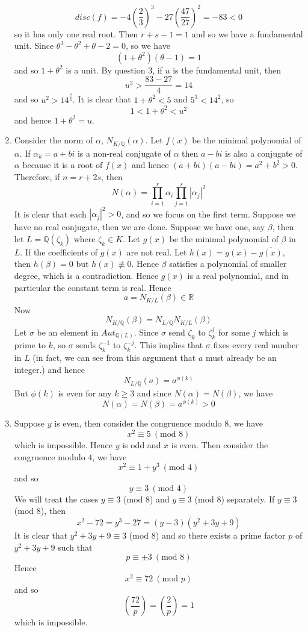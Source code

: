 \begin{enumerate}
$$disc(f)=-4(\frac{2}{3})^3-27(\frac{47}{27})^2=-83<0$$
so it has only one real root. Then $r+s-1=1$ and so we have a fundamental unit. Since $\theta^3-\theta^2+\theta-2=0$, so we have
$$(1+\theta^2)(\theta-1)=1$$
and so $1+\theta^2$ is a unit.
By question $3$, if $u$ is the fundamental unit, then
$$u^3>\frac{83-27}{4}=14$$
and so $u^2>14^{\frac{2}{3}}$.
It is clear that $1+\theta^2<5$ and $5^3<14^2$, so
$$1<1+\theta^2<u^2$$
and hence $1+\theta^2=u$.
\item Consider the norm of $\alpha$, $N_{K/\mathbb{Q}}(\alpha)$. Let $f(x)$ be the minimal polynomial of $\alpha$.
If $\alpha_k=a+bi$ is a non-real conjugate of $\alpha$ then $a-bi$ is also a conjugate of $\alpha$ because it is a root of $f(x)$ and hence
$(a+bi)(a-bi)=a^2+b^2>0$. Therefore, if $n=r+2s$, then
$$N(\alpha)=\prod_{i=1}^r \alpha_i \prod_{j=1}^s |\alpha_j|^2$$
It is clear that each $|\alpha_j|^2>0$, and so we focus on the first term. Suppose we have no real conjugate, then
we are done. Suppose we have one, say $\beta$, then let $L=\mathbb{Q}(\zeta_k)$ where $\zeta_k \in K$.
Let $g(x)$ be the minimal polynomial of $\beta$ in $L$.
If the coefficients of $g(x)$ are not real.
Let $h(x)=g(x)-\overline{g(x)}$, then $h(\beta)=0$ but $h(x) \not \equiv 0$. Hence $\beta$ satisfies a
polynomial of smaller degree, which is a contradiction. Hence $g(x)$ is a real polynomial, and in particular
the constant term is real. Hence
$$a=N_{K/L}(\beta) \in \mathbb{R}$$
Now
$$N_{K/\mathbb{Q}}(\beta)=N_{L/\mathbb{Q}} N_{K/L}(\beta)$$
Let $\sigma$ be an element in $Aut_{\mathbb{Q}(L)}$. Since $\sigma$ send $\zeta_k$ to $\zeta^j_k$ for some $j$
which is prime to $k$, so $\sigma$ sends $\zeta^{-1}_k$ to $\zeta^{-j}_k$. This implies that
$\sigma$ fixes every real number in $L$ (in fact, we can see from this argument that $a$ must already be an integer.) and hence
$$N_{L/\mathbb{Q}}(a)=a^{\phi(k)}$$
But $\phi(k)$ is even for any $k \ge 3$ and since $N(\alpha)=N(\beta)$, we have
$$N(\alpha)=N(\beta)=a^{\phi(k)}>0$$
\item Suppose $y$ is even, then consider the congruence modulo $8$, we have
$$x^2 \equiv 5~(\text{mod } 8)$$
which is impossible. Hence $y$ is odd and $x$ is even. Then consider the congruence modulo $4$,
we have
$$x^2 \equiv 1+y^3~(\text{mod } 4)$$
and so
$$y \equiv 3~(\text{mod } 4)$$
We will treat the cases $y \equiv 3$ (mod $8$) and $y \equiv 3$ (mod $8$) separately.
If $y \equiv 3$ (mod $8$), then
$$x^2-72=y^3-27=(y-3)(y^2+3y+9)$$
It is clear that $y^2+3y+9 \equiv 3$ (mod $8$) and so there exists a prime factor $p$ of $y^2+3y+9$ such that
$$p \equiv \pm 3~(\text{mod }8)$$
Hence
$$x^2 \equiv 72~(\text{mod } p)$$
and so
$$\left(\frac{72}{p}\right)=\left(\frac{2}{p}\right)=1$$
which is impossible.


\end{enumerate}
